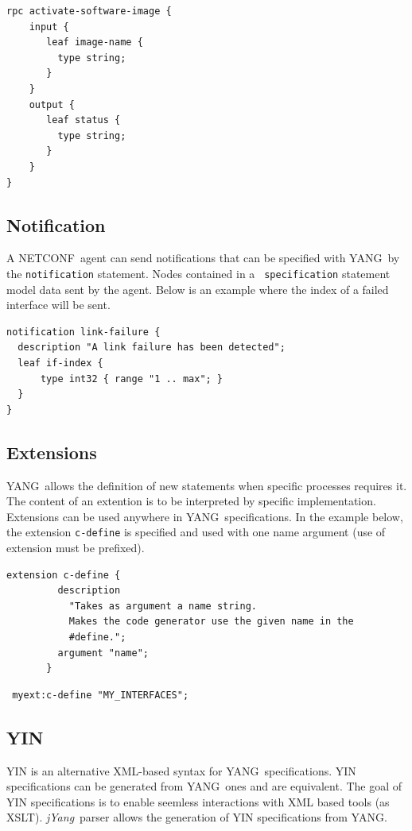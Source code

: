 \documentclass[a4paper]{article}
\newcommand{\jyang}{{\sl jYang}}
\newcommand{\nc}{NETCONF}
\newcommand{\y}{YANG}
\begin{document}
\begin{lstlisting}
rpc activate-software-image {
    input {
       leaf image-name {
         type string;
       }
    }
    output {
       leaf status {
         type string;
       }
    }
}
\end{lstlisting}

\subsection{Notification}

A \nc\ agent can send notifications  that can be specified with \y\ by
the  {\tt   notification}  statement.   Nodes  contained   in  a  {\tt
specification} statement  model data sent  by the agent.  Below  is an
example where the index of a failed interface will be sent.

\begin{lstlisting} 
notification link-failure {
  description "A link failure has been detected";
  leaf if-index {
      type int32 { range "1 .. max"; }
  }
}
\end{lstlisting}

\subsection{Extensions}

\y\ allows  the definition of  new statements when  specific processes
requires  it. The  content of  an extention  is to  be  interpreted by
specific  implementation.   Extensions can  be  used  anywhere in  \y\
specifications. In the example  below, the extension {\tt c-define} is
specified and  used with one name  argument (use of  extension must be
prefixed).

\begin{lstlisting}
extension c-define {
         description
           "Takes as argument a name string.
           Makes the code generator use the given name in the
           #define.";
         argument "name";
       }
\end{lstlisting}

\begin{lstlisting}
 myext:c-define "MY_INTERFACES";
\end{lstlisting}


\subsection{YIN}

YIN  is an alternative  XML-based syntax  for \y\  specifications. YIN
specifications can be generated from  \y\ ones and are equivalent. The
goal of YIN specifications is to enable seemless interactions with XML
based tools  (as XSLT).  \jyang\  parser allows the generation  of YIN
specifications from \y.
\end{document}
